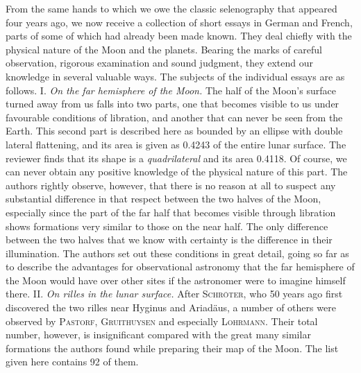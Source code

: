 From the same hands to which we owe the classic selenography that appeared four years ago, we now receive a collection of short essays in German and French, parts of some of which had already been made known. They deal chiefly with the physical nature of the Moon and the planets. Bearing the marks of careful observation, rigorous examination and sound judgment, they extend our knowledge in several valuable ways. The subjects of the individual essays are as follows.
I. \emph{On the far hemisphere of the Moon.} The half of the Moon's surface turned away from us falls into two parts, one that becomes visible to us under favourable conditions of libration, and another that can never be seen from the Earth. This second part is described here as bounded by an ellipse with double lateral flattening, and its area is given as 0.4243 of the entire lunar surface. The reviewer finds that its shape is a \emph{quadrilateral} and its area 0.4118. Of course, we can never obtain any positive knowledge of the physical nature of this part. The authors rightly observe, however, that there is no reason at all to suspect any substantial difference in that respect between the two halves of the Moon, especially since the part of the far half that becomes visible through libration shows formations very similar to those on the near half. The only difference between the two halves that we know with certainty is the difference in their illumination. The authors set out these conditions in great detail, going so far as to describe the advantages for observational astronomy that the far hemisphere of the Moon would have over other sites if the astronomer were to imagine himself there.
II. \emph{On rilles in the lunar surface.} After \textsc{Schröter}, who 50 years ago first discovered the two rilles near Hyginus and Ariadäus, a number of others were observed by \textsc{Pastorf}, \textsc{Gruithuysen} and especially \textsc{Lohrmann}. Their total number, however, is insignificant compared with the great many similar formations the authors found while preparing their map of the Moon. The list given here contains 92 of them.

